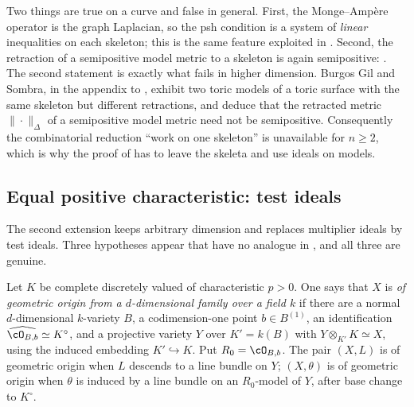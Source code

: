 \begin{remark}
\label{rem:ch23-curve-specialness}
Two things are true on a curve and false in general.  First, the
Monge--Amp\`ere operator is the graph Laplacian, so the psh condition is a
system of \emph{linear} inequalities on each skeleton; this is the same
feature exploited in .  Second, the
retraction of a semipositive model metric to a skeleton is again
semipositive: \cite[Proposition~1.2 and Propositions~3.5, 3.8]{GJKM19}.  The
second statement is exactly what fails in higher dimension.  Burgos Gil and
Sombra, in the appendix to \cite{GJKM19}, exhibit two toric models of a
toric surface with the same skeleton but different retractions, and deduce
that the retracted metric $\|\cdot\|_\Delta$ of a semipositive model
metric need not be semipositive.  Consequently the combinatorial reduction
``work on one skeleton'' is unavailable for $n\geq2$, which is why the
proof of  has to leave the skeleta and use
ideals on models.
\end{remark}

\subsection{Equal positive characteristic: test ideals}
\label{sec:ch23-later-test-ideals}

The second extension keeps arbitrary dimension and replaces multiplier
ideals by test ideals.  Three hypotheses appear that have no analogue in
, and all three are genuine.

\begin{definition}
\label{def:ch23-geometric-origin}
Let $K$ be complete discretely valued of characteristic $p>0$.  One says
that $X$ is \emph{of geometric origin from a $d$-dimensional family over
a field $k$} if there are a normal $d$-dimensional $k$-variety $B$,
a codimension-one point $b\in B^{(1)}$, an identification
$\widehat{\cO_{B,b}}\simeq K^\circ$, and a projective variety $Y$
over $K'=k(B)$ with $Y\otimes_{K'}K\simeq X$, using the induced
embedding $K'\hookrightarrow K$.  Put $R_0=\cO_{B,b}$.  The pair
$(X,L)$ is of geometric origin when $L$ descends to a line bundle on $Y$;
$(X,\theta)$ is of geometric origin when $\theta$ is induced by a line
bundle on an $R_0$-model of $Y$, after base change to $K^\circ$.
\end{definition}


